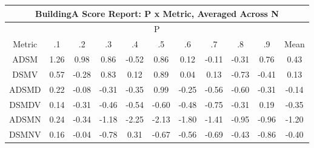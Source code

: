 \documentclass[11pt,a4paper]{report}
\begin{document}
\begin{longtable}{ | c || c | c | c | c | c | c | c | c | c || c |}
\hline
\multicolumn{11}{|c|}{ BuildingA Score Report: P x Metric, Averaged Across N } \\
\hline
\multicolumn{11}{|c|}{ P } \\
\hline
Metric & .1 & .2 & .3 & .4 & .5 & .6 & .7 & .8 & .9 & Mean\\
\hline
\hline
\endhead
ADSM &  \cellcolor[HTML]{DFDFFF} 1.26 &  \cellcolor[HTML]{E7E7FF} 0.98 &  \cellcolor[HTML]{E7E7FF} 0.86 &  \cellcolor[HTML]{FFEFEF} -0.52 &  \cellcolor[HTML]{E7E7FF} 0.86 &  \cellcolor[HTML]{FFFFFF} 0.12 &  \cellcolor[HTML]{FFFFFF} -0.11 &  \cellcolor[HTML]{FFF7F7} -0.31 &  \cellcolor[HTML]{EFEFFF} 0.76 &  \cellcolor[HTML]{F7F7FF} 0.43 \\
DSMV &  \cellcolor[HTML]{EFEFFF} 0.57 &  \cellcolor[HTML]{FFF7F7} -0.28 &  \cellcolor[HTML]{E7E7FF} 0.83 &  \cellcolor[HTML]{FFFFFF} 0.12 &  \cellcolor[HTML]{E7E7FF} 0.89 &  \cellcolor[HTML]{FFFFFF} 0.04 &  \cellcolor[HTML]{FFFFFF} 0.13 &  \cellcolor[HTML]{FFEFEF} -0.73 &  \cellcolor[HTML]{FFF7F7} -0.41 &  \cellcolor[HTML]{FFFFFF} 0.13 \\
ADSMD &  \cellcolor[HTML]{F7F7FF} 0.22 &  \cellcolor[HTML]{FFFFFF} -0.08 &  \cellcolor[HTML]{FFF7F7} -0.31 &  \cellcolor[HTML]{FFF7F7} -0.35 &  \cellcolor[HTML]{E7E7FF} 0.99 &  \cellcolor[HTML]{FFF7F7} -0.25 &  \cellcolor[HTML]{FFEFEF} -0.56 &  \cellcolor[HTML]{FFEFEF} -0.60 &  \cellcolor[HTML]{FFF7F7} -0.31 &  \cellcolor[HTML]{FFFFFF} -0.14 \\
DSMDV &  \cellcolor[HTML]{FFFFFF} 0.14 &  \cellcolor[HTML]{FFF7F7} -0.31 &  \cellcolor[HTML]{FFF7F7} -0.46 &  \cellcolor[HTML]{FFEFEF} -0.54 &  \cellcolor[HTML]{FFEFEF} -0.60 &  \cellcolor[HTML]{FFF7F7} -0.48 &  \cellcolor[HTML]{FFEFEF} -0.75 &  \cellcolor[HTML]{FFF7F7} -0.31 &  \cellcolor[HTML]{F7F7FF} 0.19 &  \cellcolor[HTML]{FFF7F7} -0.35 \\
ADSMN &  \cellcolor[HTML]{F7F7FF} 0.24 &  \cellcolor[HTML]{FFF7F7} -0.34 &  \cellcolor[HTML]{FFDFDF} -1.18 &  \cellcolor[HTML]{FFC7C7} -2.25 &  \cellcolor[HTML]{FFC7C7} -2.13 &  \cellcolor[HTML]{FFCFCF} -1.80 &  \cellcolor[HTML]{FFDFDF} -1.41 &  \cellcolor[HTML]{FFE7E7} -0.95 &  \cellcolor[HTML]{FFE7E7} -0.96 &  \cellcolor[HTML]{FFDFDF} -1.20 \\
DSMNV &  \cellcolor[HTML]{F7F7FF} 0.16 &  \cellcolor[HTML]{FFFFFF} -0.04 &  \cellcolor[HTML]{FFEFEF} -0.78 &  \cellcolor[HTML]{F7F7FF} 0.31 &  \cellcolor[HTML]{FFEFEF} -0.67 &  \cellcolor[HTML]{FFEFEF} -0.56 &  \cellcolor[HTML]{FFEFEF} -0.69 &  \cellcolor[HTML]{FFF7F7} -0.43 &  \cellcolor[HTML]{FFE7E7} -0.86 &  \cellcolor[HTML]{FFF7F7} -0.40 \\

\end{longtable}
\end{document}
